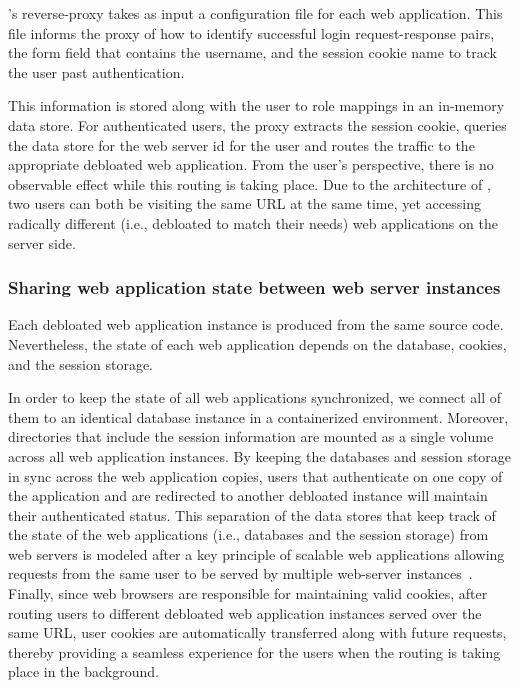 \dbltr{}'s reverse-proxy takes as input a configuration file for each web application. 
This file informs the proxy of how to identify successful login request-response pairs, the form field that contains the username, and the session cookie name to track the user past authentication. 

This information is stored along with the user to role mappings in an in-memory data store. 
For authenticated users, the proxy extracts the session cookie, queries the data store for the web server id for the user and routes the traffic to the appropriate debloated web application. 
From the user's perspective, there is no observable effect while this routing is taking place. Due to the architecture of \dbltr{}, two users can both be visiting the same URL at the same time, yet accessing radically different (i.e., debloated to match their needs) web applications on the server side.

\subsubsection{Sharing web application state between web server instances}

Each debloated web application instance is produced from the same source code. 
Nevertheless, the state of each web application depends on the database, cookies, and the session storage. 

In order to keep the state of all web applications synchronized, we connect all of them to an identical database instance in a containerized environment. 
Moreover, directories that include the session information are mounted as a single volume across all web application instances. 
By keeping the databases and session storage in sync across the web application copies, users that authenticate on one copy of the application and are redirected to another debloated instance will maintain their authenticated status. This separation of the data stores that keep track of the state of the web applications (i.e., databases and the session storage) from web servers is modeled after a key principle of scalable web applications allowing requests from the same user to be served by multiple web-server instances~\cite{scalability-book}.
Finally, since web browsers are responsible for maintaining valid cookies, after routing users to different debloated web application instances served over the same URL, user cookies are automatically transferred along with future requests, thereby providing a seamless experience for the users when the routing is taking place in the background.
